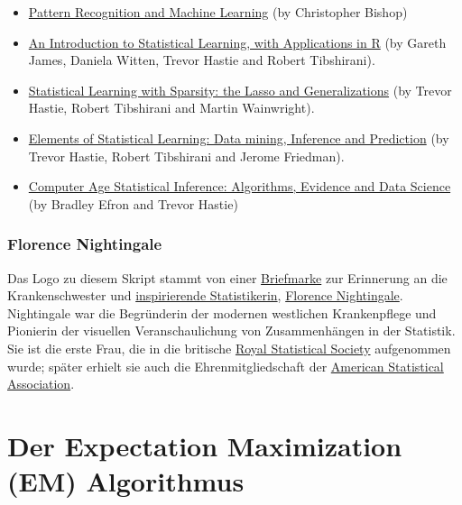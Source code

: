 \documentclass[
  ngerman,
]{book}
\begin{document}
\begin{itemize}
\item
  \href{https://www.microsoft.com/en-us/research/uploads/prod/2006/01/Bishop-Pattern-Recognition-and-Machine-Learning-2006.pdf}{Pattern Recognition and Machine Learning} (by Christopher Bishop)
\item
  \href{https://trevorhastie.github.io/ISLR/}{An Introduction to Statistical Learning, with Applications in R} (by Gareth James, Daniela Witten, Trevor Hastie and Robert Tibshirani).
\item
  \href{https://web.stanford.edu/~hastie/StatLearnSparsity/}{Statistical Learning with Sparsity: the Lasso and Generalizations} (by Trevor Hastie, Robert Tibshirani and Martin Wainwright).
\item
  \href{https://web.stanford.edu/~hastie/ElemStatLearn/}{Elements of Statistical Learning: Data mining, Inference and Prediction} (by Trevor Hastie, Robert Tibshirani and Jerome Friedman).
\item
  \href{https://web.stanford.edu/~hastie/CASI/}{Computer Age Statistical Inference: Algorithms, Evidence and Data Science} (by Bradley Efron and Trevor Hastie)
\end{itemize}

\hypertarget{florence-nightingale}{%
\subsection*{Florence Nightingale}\label{florence-nightingale}}

Das Logo zu diesem Skript stammt von einer \href{https://de.wikipedia.org/wiki/Datei:DBP_1955_225_Florence_Nightingale.jpg}{Briefmarke} zur Erinnerung an die Krankenschwester und \href{https://infowetrust.com/project/designhero}{inspirierende Statistikerin}, \href{https://de.wikipedia.org/wiki/Florence_Nightingale}{Florence Nightingale}. Nightingale war die Begründerin der modernen westlichen Krankenpflege und Pionierin der visuellen Veranschaulichung von Zusammenhängen in der Statistik. Sie ist die erste Frau, die in die britische \href{https://rss.org.uk/}{Royal Statistical Society} aufgenommen wurde; später erhielt sie auch die Ehrenmitgliedschaft der \href{https://www.amstat.org/}{American Statistical Association}.

\hypertarget{der-expectation-maximization-em-algorithmus}{%
\chapter{Der Expectation Maximization (EM) Algorithmus}\label{der-expectation-maximization-em-algorithmus}}
\end{document}
